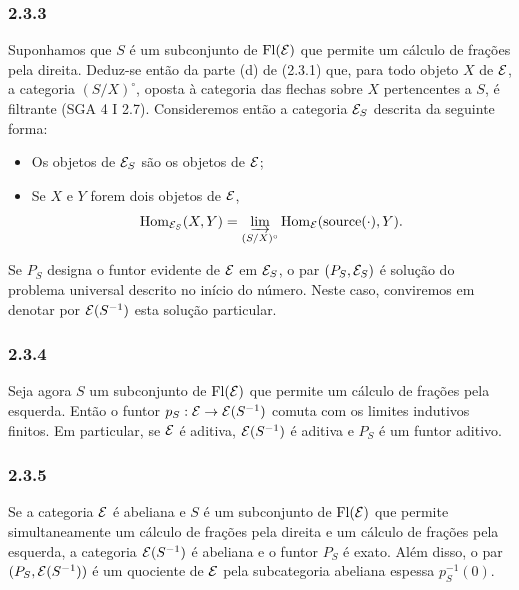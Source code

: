 \subsubsection*{2.3.3}
Suponhamos que $S$ é um subconjunto de $\operatorname{Fl}(\mathcal E)$ que permite um cálculo de frações pela direita. Deduz-se então da parte (d) de (2.3.1) que, para todo objeto $X$ de $\mathcal E$, a categoria $(S/X)^\circ$, oposta à categoria das flechas sobre $X$ pertencentes a $S$, é filtrante (SGA 4 I 2.7). Consideremos então a categoria $\mathcal E_S$ descrita da seguinte forma:
\begin{itemize}
\item Os objetos de $\mathcal E_S$ são os objetos de $\mathcal E$;
\item Se $X$ e $Y$ forem dois objetos de $\mathcal E$,
\[
\operatorname{Hom}_{\mathcal E_S}(X,Y)=\varinjlim_{(S/X)^\circ}\operatorname{Hom}_{\mathcal E}(\operatorname{source}(\cdot),Y).
\]
\end{itemize}
Se $P_S$ designa o funtor evidente de $\mathcal E$ em $\mathcal E_S$, o par $(P_S,\mathcal E_S)$ é solução do problema universal descrito no início do número. Neste caso, conviremos em denotar por $\mathcal E(S^{-1})$ esta solução particular.

\subsubsection*{2.3.4}
Seja agora $S$ um subconjunto de $\operatorname{Fl}(\mathcal E)$ que permite um cálculo de frações pela esquerda. Então o funtor $p_S:\mathcal E\to\mathcal E(S^{-1})$ comuta com os limites indutivos finitos. Em particular, se $\mathcal E$ é aditiva, $\mathcal E(S^{-1})$ é aditiva e $P_S$ é um funtor aditivo.

\subsubsection*{2.3.5}
Se a categoria $\mathcal E$ é abeliana e $S$ é um subconjunto de $\operatorname{Fl}(\mathcal E)$ que permite simultaneamente um cálculo de frações pela direita e um cálculo de frações pela esquerda, a categoria $\mathcal E(S^{-1})$ é abeliana e o funtor $P_S$ é exato. Além disso, o par $(P_S,\mathcal E(S^{-1}))$ é um quociente de $\mathcal E$ pela subcategoria abeliana espessa $p_S^{-1}(0)$.
